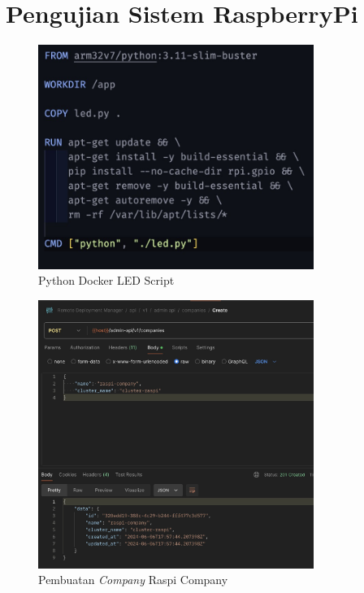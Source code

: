 \chapter{Pengujian Sistem RaspberryPi}

\begin{figure}[ht]
  \centering
  \includegraphics[width=0.8\textwidth]{resources/chapter-4/pengujian/pengujian-sistem-raspi-09-dockerfile.jpg}
  \caption{Python Docker LED Script}
  \label{fig:raspi-docker-led-script}
\end{figure}

\begin{figure}[ht]
  \centering
  \includegraphics[width=0.8\textwidth]{resources/chapter-4/pengujian/pengujian-sistem-raspi-01.jpg}
  \caption{Pembuatan \textit{Company} Raspi Company}
  \label{fig:pengujian-sistem-raspi-01}
\end{figure}

